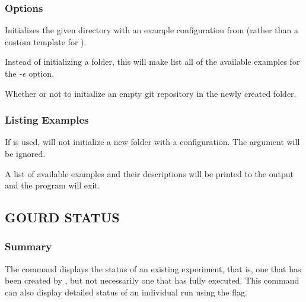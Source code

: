 \documentclass[a4paper,english]{article}
\begin{document}
\begin{adjustwidth}{18pt}{0pt}
            \subsubsection{Options}
                \begin{Description}[Options]
                    \item[\OptArg{-e, \ddash example}{ example-name}]
                      Initializes the given directory with an example configuration from 
                      (rather than a custom template for ).
                    \item[\Opt{\ddash list-examples}]
                      Instead of initializing a folder, this will make  list all of the available
                      examples for the \emph{-e} option.
                    \item[\OptArg{\ddash git}{=true|false}]
                      Whether or not to initialize an empty git repository in the newly created folder.
                \end{Description}

            \subsubsection{Listing Examples}
                If  is used,   will not initialize a new folder with
                a configuration. The  argument will be ignored.

                A list of available examples and their descriptions will be printed to the output and
                the program will exit.

        \subsection{GOURD STATUS}

            \subsubsection{Summary}
                The   command displays the status of an existing experiment,
                that is, one that has been created by  , but not necessarily
                one that has fully executed.
                This command can also display detailed status of an individual run using the  flag.


\end{adjustwidth}
\end{document}

